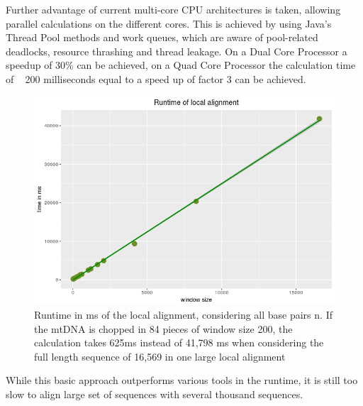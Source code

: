 Further advantage of current multi-core CPU architectures is taken, allowing parallel calculations on the different cores. This is achieved by using Java’s Thread Pool methods and work queues, which are aware of pool-related deadlocks, resource thrashing and thread leakage. On a Dual Core Processor a speedup of 30\% can be achieved, on a Quad Core Processor the calculation time of ~ 200 milliseconds equal to a speed up of factor 3 can be achieved.
\begin{figure}[!ht]

    \centering
    \includegraphics[width=1\textwidth]{images/fig4_8.png}
    \caption[Runtime in ms of Gotoh for n/i ]{Runtime in ms of the local alignment, considering all base pairs n. If the mtDNA is chopped in 84 pieces of window size 200, the calculation takes 625ms instead of 41,798 ms when considering the full length sequence of 16,569 in one large local alignment} 
    \label{fig:runtimeSW}    
\end{figure}
While this basic approach outperforms various tools in the runtime, it is still too slow to align large set of sequences with several thousand sequences. 

